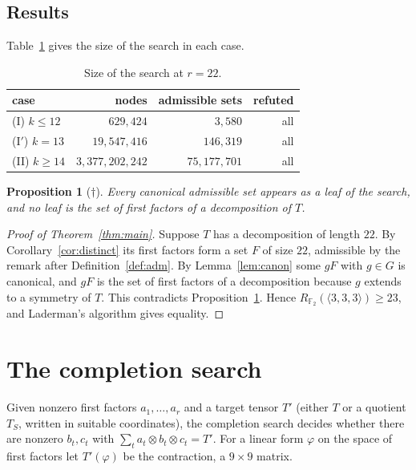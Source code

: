 \documentclass[11pt]{amsart}
\newtheorem{proposition}[theorem]{Proposition}
\theoremstyle{definition}
\theoremstyle{remark}
\numberwithin{equation}{section}
\newcommand{\F}{\mathbb{F}_2}
\newcommand{\mm}{\langle 3,3,3\rangle}
\begin{document}
\subsection{Results}
Table~\ref{tab:search} gives the size of the search in each case.

\begin{table}[ht]
\caption{Size of the search at $r=22$.}\label{tab:search}
\centering
\begin{tabular}{@{}lrrr@{}}
\toprule
case & nodes & admissible sets & refuted\\
\midrule
(I) $k\le 12$ & $629{,}424$ & $3{,}580$ & all\\
(I$'$) $k=13$ & $19{,}547{,}416$ & $146{,}319$ & all\\
(II) $k\ge 14$ & $3{,}377{,}202{,}242$ & $75{,}177{,}701$ & all\\
\bottomrule
\end{tabular}
\end{table}

\begin{proposition}[$\dagger$]\label{prop:search}
Every canonical admissible set appears as a leaf of the search, and no leaf is the set of first factors of a decomposition of $T$.
\end{proposition}

\begin{proof}[Proof of Theorem~\ref{thm:main}]
Suppose $T$ has a decomposition of length $22$. By Corollary~\ref{cor:distinct} its first factors form a set $F$ of size $22$, admissible by the remark after Definition~\ref{def:adm}. By Lemma~\ref{lem:canon} some $gF$ with $g\in G$ is canonical, and $gF$ is the set of first factors of a decomposition because $g$ extends to a symmetry of $T$. This contradicts Proposition~\ref{prop:search}. Hence $R_{\F}(\mm)\ge 23$, and Laderman's algorithm gives equality.
\end{proof}

\section{The completion search}\label{sec:tsolve}

Given nonzero first factors $a_1,\dots,a_r$ and a target tensor $T'$ (either $T$ or a quotient $T_S$, written in suitable coordinates), the completion search decides whether there are nonzero $b_t,c_t$ with $\sum_ta_t\otimes b_t\otimes c_t=T'$. For a linear form $\varphi$ on the space of first factors let $T'(\varphi)$ be the contraction, a $9\times 9$ matrix.
\end{document}
